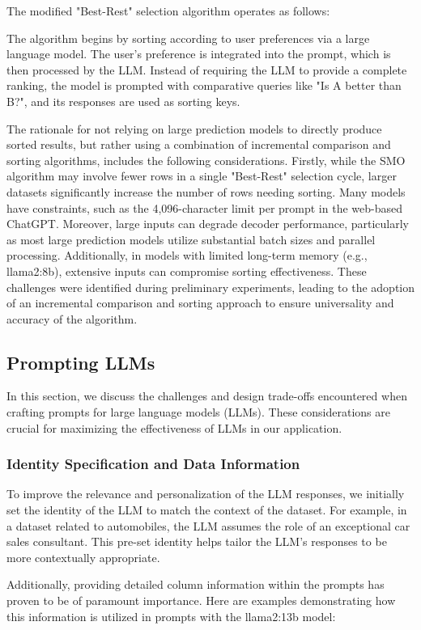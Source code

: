 \documentclass{ieeeaccess}
\begin{document}
The modified "Best-Rest" selection algorithm operates as follows:

The algorithm begins by sorting according to user preferences via a large language model. The user's preference is integrated into the prompt, which is then processed by the LLM. Instead of requiring the LLM to provide a complete ranking, the model is prompted with comparative queries like "Is A better than B?", and its responses are used as sorting keys.

The rationale for not relying on large prediction models to directly produce sorted results, but rather using a combination of incremental comparison and sorting algorithms, includes the following considerations. Firstly, while the SMO algorithm may involve fewer rows in a single "Best-Rest" selection cycle, larger datasets significantly increase the number of rows needing sorting. Many models have constraints, such as the 4,096-character limit per prompt in the web-based ChatGPT. Moreover, large inputs can degrade decoder performance, particularly as most large prediction models utilize substantial batch sizes and parallel processing. Additionally, in models with limited long-term memory (e.g., llama2:8b), extensive inputs can compromise sorting effectiveness. These challenges were identified during preliminary experiments, leading to the adoption of an incremental comparison and sorting approach to ensure universality and accuracy of the algorithm.
\subsection{Prompting LLMs}
In this section, we discuss the challenges and design trade-offs encountered when crafting prompts for large language models (LLMs). These considerations are crucial for maximizing the effectiveness of LLMs in our application.

\subsubsection{Identity Specification and Data Information}

To improve the relevance and personalization of the LLM responses, we initially set the identity of the LLM to match the context of the dataset. For example, in a dataset related to automobiles, the LLM assumes the role of an exceptional car sales consultant. This pre-set identity helps tailor the LLM’s responses to be more contextually appropriate.

Additionally, providing detailed column information within the prompts has proven to be of paramount importance. Here are examples demonstrating how this information is utilized in prompts with the llama2:13b model:
\end{document}
